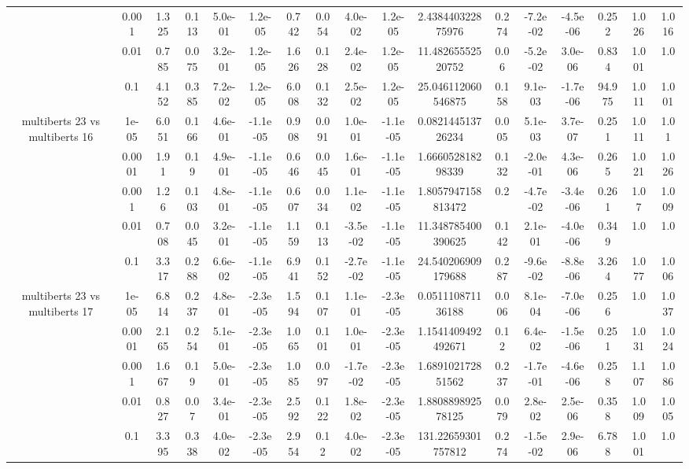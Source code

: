 \begin{tabular}{|c|c|c|c|c|c|c|c|c|c|c|c|c|c|c|c|c|}
 & 0.001 & 1.325 & 0.113 & 5.0e-01 & 1.2e-05 & 0.742 & 0.054 & 4.0e-02 & 1.2e-05 & 2.438440322875976 & 0.274 & -7.2e-02 & -4.5e-06 & 0.252 & 1.026 & 1.016 \\
 & 0.01 & 0.785 & 0.075 & 3.2e-01 & 1.2e-05 & 1.626 & 0.128 & 2.4e-02 & 1.2e-05 & 11.48265552520752 & 0.06 & -5.2e-02 & 3.0e-06 & 0.834 & 1.001 & 1.0 \\
 & 0.1 & 4.152 & 0.385 & 7.2e-02 & 1.2e-05 & 6.008 & 0.132 & 2.5e-02 & 1.2e-05 & 25.046112060546875 & 0.158 & 9.1e-03 & -1.7e-06 & 94.975 & 1.011 & 1.001 \\
\hline
\multirow{5}{*}{multiberts 23 vs multiberts 16} & 1e-05 & 6.051 & 0.166 & 4.6e-01 & -1.1e-05 & 0.908 & 0.091 & 1.0e-01 & -1.1e-05 & 0.082144513726234 & 0.005 & 5.1e-03 & 3.7e-07 & 0.251 & 1.011 & 1.01 \\
 & 0.0001 & 1.91 & 0.19 & 4.9e-01 & -1.1e-05 & 0.646 & 0.045 & 1.6e-01 & -1.1e-05 & 1.666052818298339 & 0.132 & -2.0e-01 & 4.3e-06 & 0.265 & 1.021 & 1.026 \\
 & 0.001 & 1.26 & 0.103 & 4.8e-01 & -1.1e-05 & 0.607 & 0.034 & 1.1e-02 & -1.1e-05 & 1.8057947158813472 & 0.2 & -4.7e-02 & -3.4e-06 & 0.261 & 1.07 & 1.009 \\
 & 0.01 & 0.708 & 0.045 & 3.2e-01 & -1.1e-05 & 1.159 & 0.113 & -3.5e-02 & -1.1e-05 & 11.348785400390625 & 0.142 & 2.1e-01 & -4.0e-06 & 0.349 & 1.0 & 1.0 \\
 & 0.1 & 3.317 & 0.288 & 6.6e-02 & -1.1e-05 & 6.941 & 0.152 & -2.7e-02 & -1.1e-05 & 24.540206909179688 & 0.287 & -9.6e-02 & -8.8e-06 & 3.264 & 1.077 & 1.006 \\
\hline
\multirow{5}{*}{multiberts 23 vs multiberts 17} & 1e-05 & 6.814 & 0.237 & 4.8e-01 & -2.3e-05 & 1.594 & 0.107 & 1.1e-01 & -2.3e-05 & 0.051110871136188 & 0.006 & 8.1e-04 & -7.0e-06 & 0.256 & 1.0 & 1.037 \\
 & 0.0001 & 2.165 & 0.254 & 5.1e-01 & -2.3e-05 & 1.065 & 0.101 & 1.0e-01 & -2.3e-05 & 1.1541409492492671 & 0.12 & 6.4e-02 & -1.5e-06 & 0.251 & 1.031 & 1.024 \\
 & 0.001 & 1.667 & 0.19 & 5.0e-01 & -2.3e-05 & 1.085 & 0.097 & -1.7e-02 & -2.3e-05 & 1.689102172851562 & 0.237 & -1.7e-01 & -4.6e-06 & 0.258 & 1.107 & 1.086 \\
 & 0.01 & 0.827 & 0.07 & 3.4e-01 & -2.3e-05 & 2.592 & 0.122 & 1.8e-02 & -2.3e-05 & 1.880889892578125 & 0.079 & 2.8e-02 & 2.5e-06 & 0.358 & 1.009 & 1.005 \\
 & 0.1 & 3.395 & 0.338 & 4.0e-02 & -2.3e-05 & 2.954 & 0.12 & 4.0e-02 & -2.3e-05 & 131.22659301757812 & 0.274 & -1.5e-02 & 2.9e-06 & 6.788 & 1.001 & 1.0 \\

\end{tabular}
